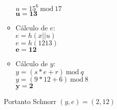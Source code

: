 \documentclass[12pt]{article}
\newcommand{\modd}{\ \text{mod}\ }
\begin{document}
\begin{itemize}
\begin{itemize}
						$u = 15^6 \modd 17$\\
						$\mathbf{u = 13}$
					\item[]
						Cálculo de $e$:\\
						$e = h(x||u)$\\
						$e = h(1213)$\\
						$\mathbf{e = 12}$	
					\item[]
						Cálculo de $y$:\\
						$y = (s*e + r) \modd q$\\
						$y = (9*12 + 6) \modd 8$\\
						$\mathbf{y = 2}$						
				\end{itemize}	
			Portanto Schnorr $(y, e) = (2, 12)$	 							
		\end{itemize}
\end{document}
